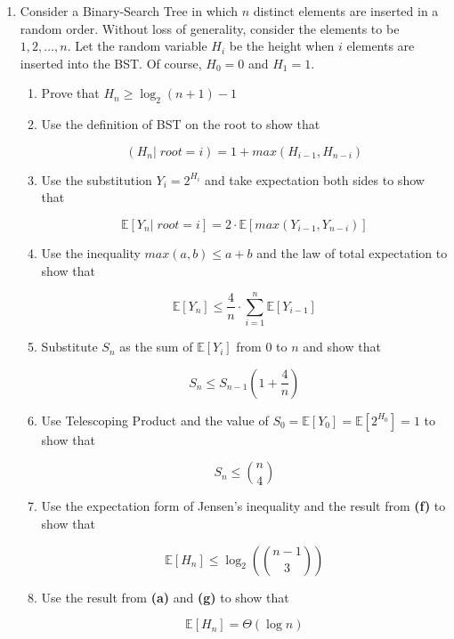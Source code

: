 \begin{enumerate}
\begin{enumerate}[label=\textbf{(\alph*)}]
\item Show that the probability of a particular bit in the array being set is $\left(1-\left(1-\frac{1}{m}\right)^{kn}\right)$ 
and thus the probability of a false positive is $\left(1-\left(1-\frac{1}{m}\right)^{kn}\right)^k$
\item Using suitable large m, n approximations, show that the optimal number of hash functions is $k=\frac{m}{n}\ln 2$
\item Put the above results together to show that the probability of a false positive is approximately $2^{-\frac{m\ln 2}{n}}$.
\end{enumerate}

\item[\textbf{3}]
Consider a Binary-Search Tree in which $n$ distinct elements are inserted in a random order. Without 
loss of generality, consider the elements to be $1,2,\ldots,n$. Let the random variable $H_i$ be the 
height when $i$ elements are inserted into the BST. Of course, $H_0=0$ and $H_1=1$.

\begin{enumerate}[label=\textbf{(\alph*)}]

\item Prove that $H_n \ge \log_2 (n+1)-1$
\item Use the definition of BST on the root to show that 

\[
(H_n | \; root=i) = 1+max(H_{i-1},H_{n-i})
\]

\item Use the substitution $Y_i = 2^{H_i}$ and take expectation both sides to show that 

\[
	\mathbb E[Y_n | \; root=i] = 2 \cdot \mathbb E[max(Y_{i-1},Y_{n-i})]
\]

\item Use the inequality $max(a,b) \le a+b$ and the law of total expectation to show that

\[
	\mathbb E[Y_n] \le \frac{4}{n} \cdot \sum_{i=1}^{n} \mathbb E[Y_{i-1}] 
\]


\item Substitute $S_n$ as the sum of $\mathbb E[Y_i]$ from $0$ to $n$ and show that 

\[
S_n \le S_{n-1} \left(1+\frac{4}{n}\right) 
\]

\item Use Telescoping Product and the value of $S_0 = \mathbb E[Y_0] = \mathbb E[2^{H_0}] = 1$ to show that 

\[
	S_n \le \binom{n}{4}
\]

\item Use the expectation form of Jensen's inequality and the result from \textbf{(f)} to show that 

\[
\mathbb E[H_n] \le \log_2 \left(\binom{n-1}{3}\right) 
\]

\item Use the result from \textbf{(a)} and \textbf{(g)} to show that 

\[
\mathbb E[H_n] = \Theta(\log n)
\]
\end{enumerate}
\end{enumerate}
